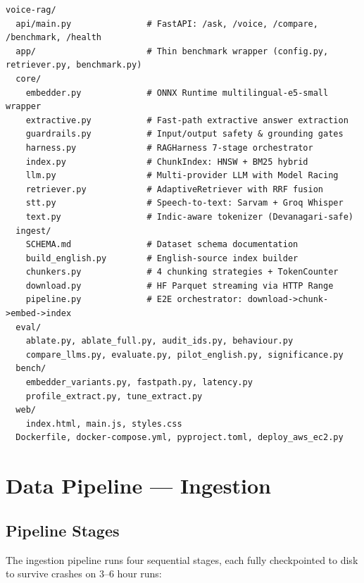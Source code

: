 \documentclass[12pt,a4paper]{article}
\begin{document}
\begin{lstlisting}[style=bashstyle, language={}, title={Directory Structure}]
voice-rag/
  api/main.py               # FastAPI: /ask, /voice, /compare, /benchmark, /health
  app/                      # Thin benchmark wrapper (config.py, retriever.py, benchmark.py)
  core/
    embedder.py             # ONNX Runtime multilingual-e5-small wrapper
    extractive.py           # Fast-path extractive answer extraction
    guardrails.py           # Input/output safety & grounding gates
    harness.py              # RAGHarness 7-stage orchestrator
    index.py                # ChunkIndex: HNSW + BM25 hybrid
    llm.py                  # Multi-provider LLM with Model Racing
    retriever.py            # AdaptiveRetriever with RRF fusion
    stt.py                  # Speech-to-text: Sarvam + Groq Whisper
    text.py                 # Indic-aware tokenizer (Devanagari-safe)
  ingest/
    SCHEMA.md               # Dataset schema documentation
    build_english.py        # English-source index builder
    chunkers.py             # 4 chunking strategies + TokenCounter
    download.py             # HF Parquet streaming via HTTP Range
    pipeline.py             # E2E orchestrator: download->chunk->embed->index
  eval/
    ablate.py, ablate_full.py, audit_ids.py, behaviour.py
    compare_llms.py, evaluate.py, pilot_english.py, significance.py
  bench/
    embedder_variants.py, fastpath.py, latency.py
    profile_extract.py, tune_extract.py
  web/
    index.html, main.js, styles.css
  Dockerfile, docker-compose.yml, pyproject.toml, deploy_aws_ec2.py
\end{lstlisting}


\section{Data Pipeline --- Ingestion}

\subsection{Pipeline Stages}

The ingestion pipeline runs four sequential stages, each fully checkpointed to disk to survive crashes on 3--6 hour runs:
\end{document}
